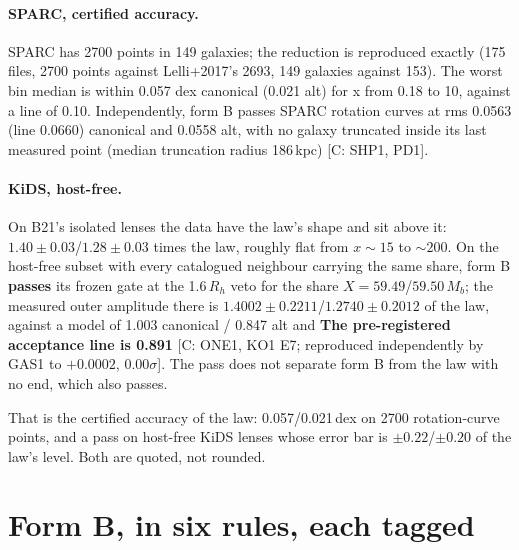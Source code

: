 \documentclass[10pt]{article}
\begin{document}
\paragraph{SPARC, certified accuracy.}
SPARC has 2700 points in 149 galaxies; the reduction is reproduced exactly (175 files, 2700 points against
Lelli+2017's 2693, 149 galaxies against 153). The worst bin median is within 0.057 dex canonical (0.021 alt)
for x from 0.18 to 10, against a line of 0.10. Independently, form B passes SPARC rotation curves at rms 0.0563
(line 0.0660) canonical and 0.0558 alt, with no galaxy truncated inside its last measured point (median
truncation radius 186\,kpc) [C: SHP1, PD1].

\paragraph{KiDS, host-free.}
On B21's isolated lenses the data have the law's shape and sit above it: $1.40\pm0.03$/$1.28\pm0.03$ times the
law, roughly flat from $x\sim15$ to $\sim200$. On the host-free subset with every catalogued neighbour carrying
the same share, form B {\bf passes} its frozen gate at the 1.6\,$R_h$ veto for the share $X=59.49$/$59.50\,M_b$;
the measured outer amplitude there is $1.4002\pm0.2211$/$1.2740\pm0.2012$ of the law, against a model of 1.003
canonical / 0.847 alt and {\bf The pre-registered acceptance line is 0.891} [C: ONE1, KO1 E7; reproduced
independently by GAS1 to $+0.0002$, $0.00\sigma$]. The pass does not separate form B from the law with no end,
which also passes.

That is the certified accuracy of the law: 0.057/0.021\,dex on 2700 rotation-curve points, and a pass on host-free
KiDS lenses whose error bar is $\pm0.22$/$\pm0.20$ of the law's level. Both are quoted, not rounded.

\section{Form B, in six rules, each tagged}
\label{sec:formb}
\end{document}
